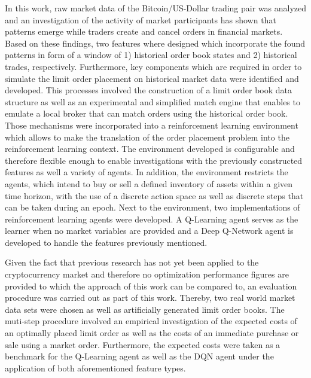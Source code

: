 In this work, raw market data of the Bitcoin/US-Dollar trading pair was analyzed and an investigation of the activity of market participants has shown that patterns emerge while traders create and cancel orders in financial markets.
Based on these findings, two features where designed which incorporate the found patterns in form of a window of 1) historical order book states and 2) historical trades, respectively.
Furthermore, key components which are required in order to simulate the limit order placement on historical market data were identified and developed.
This processes involved the construction of a limit order book data structure as well as an experimental and simplified match engine that enables to emulate a local broker that can match orders using the historical order book.
Those mechanisms were incorporated into a reinforcement learning environment which allows to make the translation of the order placement problem into the reinforcement learning context.
The environment developed is configurable and therefore flexible enough to enable investigations with the previously constructed features as well a variety of agents.
In addition, the environment restricts the agents, which intend to buy or sell a defined inventory of assets within a given time horizon, 
with the use of a discrete action space as well as discrete steps that can be taken during an epoch.
Next to the environment, two implementations of reinforcement learning agents were developed.
A Q-Learning agent serves as the learner when no market variables are provided and a Deep Q-Network agent is developed to handle the features previously mentioned.

Given the fact that previous research has not yet been applied to the cryptocurrency market and therefore no optimization performance figures are provided to which the approach of this work can be compared to, an evaluation procedure was carried out as part of this work.
Thereby, two real world market data sets were chosen as well as artificially generated limit order books.
The muti-step procedure involved an empirical investigation of the expected costs of an optimally placed limit order as well as the costs of an immediate purchase or sale using a market order.
Furthermore, the expected costs were taken as a benchmark for the Q-Learning agent as well as the DQN agent under the application of both aforementioned feature types.

